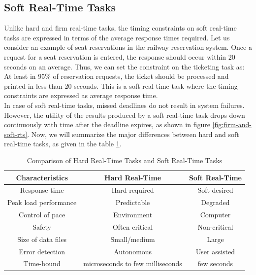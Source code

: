 \documentclass[12pt]{report}
\begin{document}
\subsection{Soft Real-Time Tasks}
Unlike hard and firm real-time tasks, the timing constraints on soft real-time tasks are expressed in terms of the average response times required. Let us consider an example of seat reservations in the railway reservation system. Once a request for a seat reservation is entered, the response should occur within 20 seconds on an average. Thus, we can set the constraint on the ticketing task as: At least in 95\% of reservation requests, the ticket should be processed and printed in less than 20 seconds. This is a soft real-time task where the timing constraints are expressed as average response time. \\

In case of soft real-time tasks, missed deadlines do not result in system failures. However, the  utility of the results produced by a soft real-time task drops down continuously with time after the deadline expires, as shown in figure \ref{fig:firm-and-soft-rts}.  Now, we will summarize the major differences between hard and soft real-time tasks, as given in the table \ref{table:2}.  
\begin{table}[h]
\centering
\begin{tabular}{|c|c|c|}
 \hline
 \textbf{Characteristics} &  \textbf{Hard Real-Time} & \textbf{Soft Real-Time}\\
 \hline \hline
 Response time & Hard-required & Soft-desired\\ 
 \hline
 Peak load performance & Predictable & Degraded \\
 \hline
 Control of pace & Environment & Computer \\ 
 \hline
 Safety & Often critical & Non-critical \\
 \hline
 Size of data files & Small/medium & Large \\
 \hline
 Error detection & Autonomous & User assisted\\
 \hline
 Time-bound & microseconds to few milliseconds & few seconds\\
 \hline
\end{tabular}
\caption{Comparison of Hard Real-Time Tasks and Soft Real-Time Tasks}
\label{table:2}
\end{table}
\end{document}
